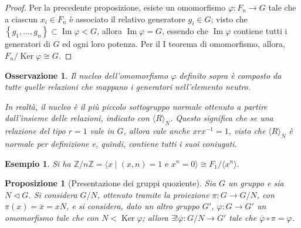 \documentclass[11pt]{article}
\theoremstyle{style}
\newtheorem{esempio}{Esempio}[section]
\newtheorem{prop}{Proposizione}[section]
\newtheorem{osservazione}{Osservazione}[section]
\numberwithin{equation}{subsection}
\begin{document}
	\begin{proof}
		Per la precedente proposizione, esiste un omomorfismo $\varphi : F_n \to G$ tale che a ciascun $x_i \in F_n$ \`e associato il relativo generatore $g_i \in G$; visto che $\left\{ g_1,\ldots,g_n \right\} \subset \operatorname{Im} \varphi < G$, allora $\operatorname{Im} \varphi = G$, essendo che $\operatorname{Im} \varphi $ contiene tutti i generatori di $G$ ed ogni loro potenza.
		Per il I teorema di omomorfismo, allora, $F_n / \operatorname{Ker} \varphi \cong G$.
	\end{proof}
\begin{osservazione}
Il nucleo dell'omomorfismo $\varphi $ definito sopra \`e composto da tutte quelle relazioni che mappano i generatori nell'elemento neutro.

In realt\`a, il nucleo \`e il pi\`u piccolo sottogruppo normale ottenuto a partire dall'insieme delle relazioni, indicato con $\langle R \rangle_N$.
Questo significa che se una relazione del tipo $r = 1$ vale in $G$, allora vale anche $xrx^{-1}=1$, visto che $\langle R \rangle_N$ \`e normale per definizione e, quindi, contiene tutti i suoi coniugati.
\end{osservazione}
\begin{esempio}
Si ha $\mathbb{Z} / n\mathbb{Z} = \langle x  \mid (x,n) = 1 \text{ e } x^n = 0 \rangle\cong F_1 / \langle x^n \rangle$.
\end{esempio}
\begin{prop}
	[Presentazione dei gruppi quoziente]
	Sia $G$ un gruppo e sia $N \lhd G$. 
	Si considera $G / N$, ottenuto tramite la proiezione $\pi : G \to G / N$, con $\pi(x) = \overline{x}=x N$, e si considera, dato un altro gruppo $G'$, $\varphi :G \to G'$ un omomorfismo tale che con $N < \operatorname{Ker} \varphi $; allora $\exists ! \overline{\varphi }: G / N \to G '$ tale che $\overline{\varphi }\circ \pi = \varphi $.
\end{prop}
\end{document}
